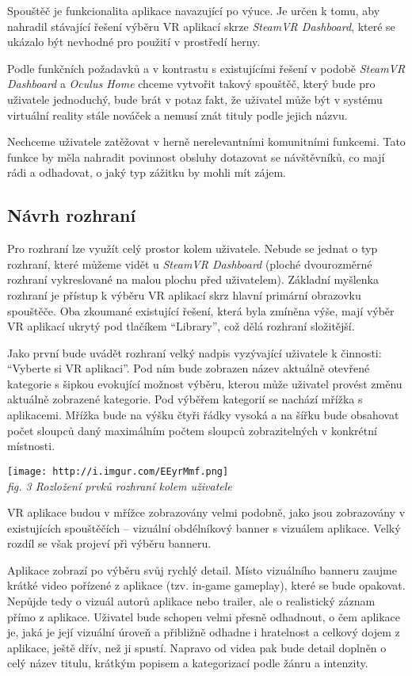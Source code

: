 Spouštěč je funkcionalita aplikace navazující po výuce. Je určen k tomu,
aby nahradil stávající řešení výběru VR aplikací skrze \emph{SteamVR
Dashboard}, které se ukázalo být nevhodné pro použití v prostředí herny.

Podle funkčních požadavků a v kontrastu s existujícími řešení v podobě
\emph{SteamVR Dashboard} a \emph{Oculus Home} chceme vytvořit takový
spouštěč, který bude pro uživatele jednoduchý, bude brát v potaz fakt,
že uživatel může být v systému virtuální reality stále nováček a nemusí
znát tituly podle jejich názvu. 

Nechceme uživatele zatěžovat v herně
nerelevantními komunitními funkcemi. Tato funkce by měla nahradit
povinnost obsluhy dotazovat se návštěvníků, co mají rádi a odhadovat, o
jaký typ zážitku by mohli mít zájem.

\subsection{Návrh rozhraní}\label{nuxe1vrh-rozhranuxed}

Pro rozhraní lze využít celý prostor kolem uživatele. Nebude se jednat o
typ rozhraní, které můžeme vidět u \emph{SteamVR Dashboard} (ploché
dvourozměrné rozhraní vykreslované na malou plochu před uživatelem).
Základní myšlenka rozhraní je přístup k výběru VR aplikací skrz hlavní
primární obrazovku spouštěče. Oba zkoumané existující řešení, která byla
zmíněna výše, mají výběr VR aplikací ukrytý pod tlačíkem ``Library'',
což dělá rozhraní složitější.

Jako první bude uvádět rozhraní velký nadpis vyzývající uživatele k
činnosti: ``Vyberte si VR aplikaci''. Pod ním bude zobrazen název
aktuálně otevřené kategorie s šipkou evokující možnost výběru, kterou
může uživatel provést změnu aktuálně zobrazené kategorie. Pod výběřem
kategorií se nachází mřížka s aplikacemi. Mřížka bude na výšku čtyři
řádky vysoká a na šířku bude obsahovat počet sloupců daný maximálním
počtem sloupců zobrazitelných v konkrétní místnosti.

\texttt{[image: http://i.imgur.com/EEyrMmf.png]}\\
\emph{fig. 3 Rozložení prvků rozhraní kolem uživatele}

VR aplikace budou v mřížce zobrazovány velmi podobně, jako jsou
zobrazovány v existujících spouštěčích -- vizuální obdélníkový banner s
vizuálem aplikace. Velký rozdíl se však projeví při výběru banneru.

Aplikace zobrazí po výběru svůj rychlý detail. Místo vizuálního banneru zaujme
krátké video pořízené z aplikace (tzv. in-game gameplay), které se bude
opakovat. Nepůjde tedy o vizuál autorů aplikace nebo trailer, ale o
realistický záznam přímo z aplikace. Uživatel bude schopen velmi přesně
odhadnout, o čem aplikace je, jaká je její vizuální úroveň a přibližně
odhadne i hratelnost a celkový dojem z aplikace, ještě dřív, než ji
spustí. Napravo od videa pak bude detail doplněn o celý název titulu,
krátkým popisem a kategorizací podle žánru a intenzity. 


